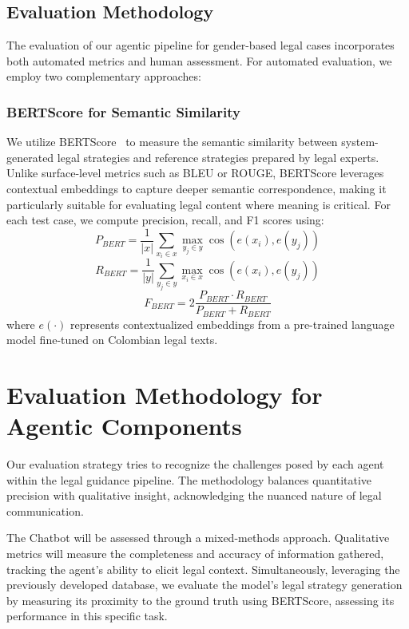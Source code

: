 \subsection{Evaluation Methodology}
The evaluation of our agentic pipeline for gender-based legal cases 
incorporates both automated metrics and human assessment. For automated 
evaluation, we employ two complementary approaches:
\subsubsection{BERTScore for Semantic Similarity}
We utilize BERTScore~\cite{zhang2020bertscoreevaluatingtextgeneration} to measure the semantic similarity between system-generated legal strategies and reference strategies prepared by legal experts. Unlike surface-level metrics such as BLEU or ROUGE, 
BERTScore leverages contextual embeddings to capture deeper semantic 
correspondence, making it particularly suitable for evaluating legal 
content where meaning is critical. For each test case, we compute 
precision, recall, and F1 scores using:
\begin{equation}
P_{BERT} = \frac{1}{|x|}\sum_{x_i \in x}\max_{y_j \in y}\cos(e(x_i), e(y_j))
\end{equation}
\begin{equation}
R_{BERT} = \frac{1}{|y|}\sum_{y_j \in y}\max_{x_i \in x}\cos(e(x_i), e(y_j))
\end{equation}
\begin{equation}
F_{BERT} = 2\frac{P_{BERT} \cdot R_{BERT}}{P_{BERT} + R_{BERT}}
\end{equation}
where $e(\cdot)$ represents contextualized embeddings from a pre-trained language model fine-tuned on Colombian legal texts.


\section{Evaluation Methodology for Agentic Components}
Our evaluation strategy tries to recognize the challenges posed by 
each agent within the legal guidance pipeline. The methodology balances 
quantitative precision with qualitative insight, acknowledging the nuanced 
nature of legal communication.

The Chatbot will be assessed through a mixed-methods approach. 
Qualitative metrics will measure the completeness and accuracy of information gathered, tracking the agent's ability to elicit legal context. Simultaneously, leveraging the previously 
developed database, we evaluate the model’s legal strategy generation by 
measuring its proximity to the ground truth using BERTScore, assessing 
its performance in this specific task.


